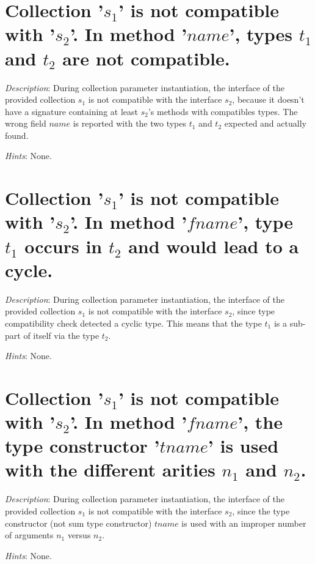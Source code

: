 \section*{Collection '$s_1$' is not compatible with '$s_2$'. In method
  '$name$', types $t_1$ and $t_2$ are not compatible.}

{\em Description}: During collection parameter instantiation, the
interface of the provided collection  $s_1$ is not compatible with the
interface  $s_2$, because it doesn't have a signature containing at
least $s_2$'s methods with compatibles types. The wrong field $name$
is reported with the two types $t_1$ and $t_2$ expected and actually
found.

{\em Hints}: None.



\section*{Collection '$s_1$' is not compatible with '$s_2$'. In method
  '$fname$', type $t_1$ occurs in $t_2$ and would lead to a cycle.}

{\em Description}: During collection parameter instantiation, the
interface of the 
provided collection  $s_1$ is not compatible with the interface $s_2$, since type compatibility check detected a cyclic
type. This means that the type $t_1$ is a sub-part of itself via the
type $t_2$.

{\em Hints}: None.



\section*{Collection  '$s_1$' is not compatible with '$s_2$'. In method
  '$fname$', the type constructor '$tname$' is used with the different
  arities $n_1$ and $n_2$.}

{\em Description}:  During collection parameter instantiation, the
interface of the 
provided collection  $s_1$ is not compatible with the interface $s_2$, since the type constructor (not sum type constructor)
$tname$ is used with an improper number of arguments $n_1$ versus
$n_2$.

{\em Hints}: None.




